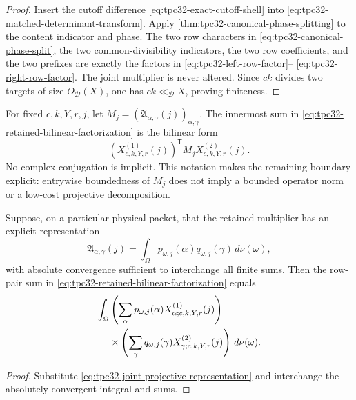 \begin{proof}
Insert the cutoff difference
\eqref{eq:tpc32-exact-cutoff-shell} into
\eqref{eq:tpc32-matched-determinant-transform}.  Apply
\cref{thm:tpc32-canonical-phase-splitting} to the content indicator and
phase.  The two row characters in
\eqref{eq:tpc32-canonical-phase-split}, the two common-divisibility
indicators, the two row coefficients, and the two prefixes are exactly
the factors in
\eqref{eq:tpc32-left-row-factor}--
\eqref{eq:tpc32-right-row-factor}.  The joint multiplier is never
altered.  Since \(ck\) divides two targets of size
\(O_{\mathscr D}(X)\), one has \(ck\ll_{\mathscr D}X\), proving
finiteness.
\end{proof}

For fixed \(c,k,Y,r,j\), let
\(M_j=(\mathfrak A_{\alpha,\gamma}(j))_{\alpha,\gamma}\).  The innermost
sum in \eqref{eq:tpc32-retained-bilinear-factorization} is the bilinear
form
\begin{equation}
 (X^{(1)}_{c,k,Y,r}(j))^{\mathsf T}
 M_jX^{(2)}_{c,k,Y,r}(j).
 \label{eq:tpc32-matrix-bilinear-form}
\end{equation}
No complex conjugation is implicit.  This notation makes the remaining
boundary explicit: entrywise boundedness of \(M_j\) does not imply a
bounded operator norm or a low-cost projective decomposition.

\begin{corollary}
\label{cor:tpc32-conditional-projective-factorization}
Suppose, on a particular physical packet, that the retained multiplier
has an explicit representation
\begin{equation}
 \mathfrak A_{\alpha,\gamma}(j)
 =\int_\Omega
 p_{\omega,j}(\alpha)q_{\omega,j}(\gamma)
 \,d\nu(\omega),
 \label{eq:tpc32-joint-projective-representation}
\end{equation}
with absolute convergence sufficient to interchange all finite sums.
Then the row-pair sum in
\eqref{eq:tpc32-retained-bilinear-factorization} equals
\begin{align}
 \int_\Omega
 &\left(\sum_\alpha
 p_{\omega,j}(\alpha)
 X^{(1)}_{\alpha;c,k,Y,r}(j)\right)
 \notag\\
 &\times
 \left(\sum_\gamma
 q_{\omega,j}(\gamma)
 X^{(2)}_{\gamma;c,k,Y,r}(j)\right)
 \,d\nu(\omega).
 \label{eq:tpc32-full-product-representation}
\end{align}
\end{corollary}

\begin{proof}
Substitute \eqref{eq:tpc32-joint-projective-representation} and
interchange the absolutely convergent integral and sums.
\end{proof}

